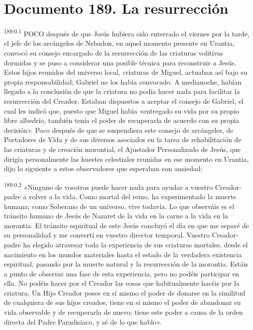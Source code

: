 \chapter{Documento 189. La resurrección}
\par 
\textsuperscript{189:0.1} POCO después de que Jesús hubiera sido enterrado el viernes por la tarde, el jefe de los arcángeles de Nebadon, en aquel momento presente en Urantia, convocó su consejo encargado de la resurrección de las criaturas volitivas dormidas y se puso a considerar una posible técnica para reconstruir a Jesús. Estos hijos reunidos del universo local, criaturas de Miguel, actuaban así bajo su propia responsabilidad; Gabriel no los había convocado. A medianoche, habían llegado a la conclusión de que la criatura no podía hacer nada para facilitar la resurrección del Creador. Estaban dispuestos a aceptar el consejo de Gabriel, el cual les indicó que, puesto que Miguel había «entregado su vida por su propio libre albedrío, también tenía el poder de recuperarla de acuerdo con su propia decisión». Poco después de que se suspendiera este consejo de arcángeles, de Portadores de Vida y de sus diversos asociados en la tarea de rehabilitación de las criaturas y de creación morontial, el Ajustador Personalizado de Jesús, que dirigía personalmente las huestes celestiales reunidas en ese momento en Urantia, dijo lo siguiente a estos observadores que esperaban con ansiedad:

\par 
\textsuperscript{189:0.2} «Ninguno de vosotros puede hacer nada para ayudar a vuestro Creador-padre a volver a la vida. Como mortal del reino, ha experimentado la muerte humana; como Soberano de un universo, vive todavía. Lo que observáis es el tránsito humano de Jesús de Nazaret de la vida en la carne a la vida en la morontia. El tránsito espiritual de este Jesús concluyó el día en que me separé de su personalidad y me convertí en vuestro director temporal. Vuestro Creador-padre ha elegido atravesar toda la experiencia de sus criaturas mortales, desde el nacimiento en los mundos materiales hasta el estado de la verdadera existencia espiritual, pasando por la muerte natural y la resurrección de la morontia. Estáis a punto de observar una fase de esta experiencia, pero no podéis participar en ella. No podéis hacer por el Creador las cosas que habitualmente hacéis por la criatura. Un Hijo Creador posee en sí mismo el poder de donarse en la similitud de cualquiera de sus hijos creados; tiene en sí mismo el poder de abandonar su vida observable y de recuperarla de nuevo; tiene este poder a causa de la orden directa del Padre Paradisiaco, y sé de lo que hablo».


